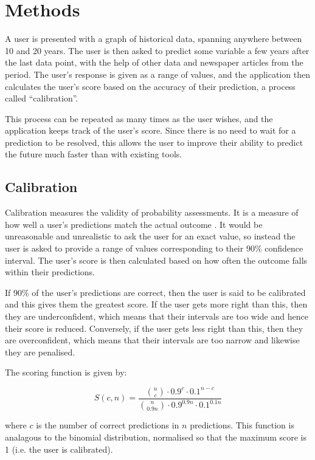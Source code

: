 \documentclass{article}
\begin{document}
\section{Methods}

A user is presented with a graph of historical data, spanning anywhere between 10 and 20 years. The user is then asked to predict some variable a few years after the last data point, with the help of other data and newspaper articles from the period. The user's response is given as a range of values, and the application then calculates the user's score based on the accuracy of their prediction, a process called ``calibration''.

This process can be repeated as many times as the user wishes, and the application keeps track of the user's score. Since there is no need to wait for a prediction to be resolved, this allows the user to improve their ability to predict the future much faster than with existing tools.

\subsection{Calibration}

Calibration measures the validity of probability assessments. It is a measure of how well a user's predictions match the actual outcome \cite{calibration}. It would be unreasonable and unrealistic to ask the user for an exact value, so instead the user is asked to provide a range of values corresponding to their 90\% confidence interval. The user's score is then calculated based on how often the outcome falls within their predictions.

If 90\% of the user's predictions are correct, then the user is said to be calibrated and this gives them the greatest score. If the user gets more right than this, then they are underconfident, which means that their intervals are too wide and hence their score is reduced. Conversely, if the user gets less right than this, then they are overconfident, which means that their intervals are too narrow and likewise they are penalised.

The scoring function is given by:

$$
S(c, n) = \dfrac{
  \binom{n}{c} \cdot 0.9^c \cdot 0.1^{n-c}
}{
  \binom{n}{0.9n} \cdot 0.9^{0.9n} \cdot 0.1^{0.1n}
}
$$

where $c$ is the number of correct predictions in $n$ predictions. This function is analagous to the binomial distribution, normalised so that the maximum score is 1 (i.e. the user is calibrated).
\end{document}
